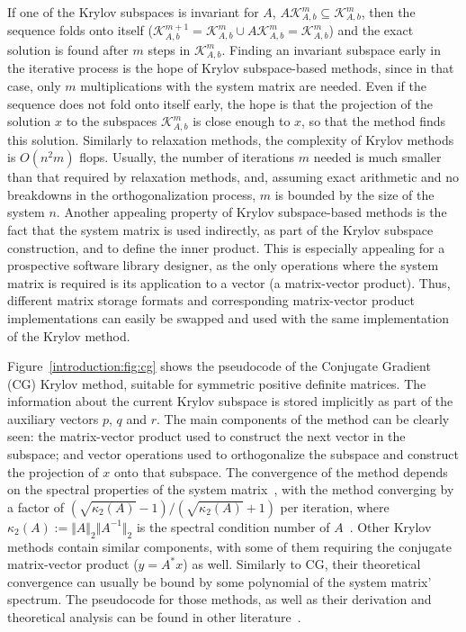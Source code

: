 If one of the Krylov subspaces is invariant for $A$, \ie $A \mathcal{K}_{A,
b}^m \subseteq \mathcal{K}_{A, b}^m$, then the sequence folds onto itself
($\mathcal{K}_{A, b}^{m + 1} = \mathcal{K}_{A, b}^m \cup A \mathcal{K}_{A, b}^m
= \mathcal{K}_{A, b}^m$) and the exact solution is found after $m$ steps in
$\mathcal{K}_{A, b}^m$. Finding an invariant subspace early in the iterative
process is the hope of Krylov subspace-based methods, since in that case, only
$m$ multiplications with the system matrix are needed. Even if the sequence does
not fold onto itself early, the hope is that the projection of the solution $x$
to the subspaces $\mathcal{K}_{A, b}^m$ is close enough to $x$, so that the
method finds this solution. Similarly to relaxation methods, the complexity of
Krylov methods is $O(n^2 m)$ flops. Usually, the number of iterations $m$ needed
is much smaller than that required by relaxation methods, and, assuming exact
arithmetic and no breakdowns in the orthogonalization process, $m$ is bounded by
the size of the system $n$.  Another appealing property of Krylov subspace-based
methods is the fact that the system matrix is used indirectly, as part of the
Krylov subspace construction, and to define the inner product. This is
especially appealing for a prospective software library designer, as the only
operations where the system matrix is required is its application to a vector
(\ie a matrix-vector product).  Thus, different matrix storage formats and
corresponding matrix-vector product implementations can easily be swapped and
used with the same implementation of the Krylov method.

Figure~\ref{introduction:fig:cg} shows the pseudocode of the Conjugate Gradient
(CG) Krylov method, suitable for symmetric positive definite matrices. The
information about the current Krylov subspace is stored implicitly as part of
the auxiliary vectors $p$, $q$ and $r$. The main components of the method can
be clearly seen: the matrix-vector product used to construct the next vector in
the subspace; and vector operations used to orthogonalize the subspace and
construct the projection of $x$ onto that subspace. The convergence of the
method depends on the spectral properties
of the system matrix~\cite{barrettemplates,demmel,saad}, with the method
converging by a factor of $(\sqrt{\kappa_2(A)} - 1)/(\sqrt{\kappa_2(A)} + 1)$
per iteration, where $\kappa_2(A) := \Vert A \Vert_2 \Vert A^{-1} \Vert_2$ is
the spectral condition number of $A$~\cite{barrettemplates,demmel,saad}. Other
Krylov methods contain similar components, with some of them requiring the
conjugate matrix-vector product ($y = A^*x$) as well. Similarly to CG, their
theoretical convergence can usually be bound by some polynomial of the system
matrix' spectrum. The pseudocode for those methods, as well as their derivation
and theoretical analysis can be found in other
literature~\cite{barrettemplates,demmel,saad}.

